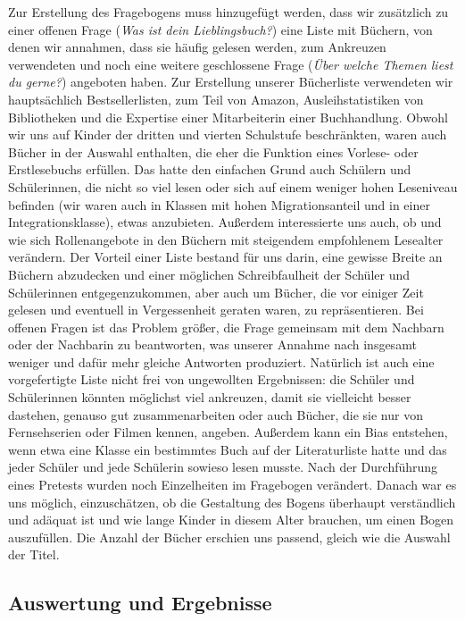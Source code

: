 Zur Erstellung des Fragebogens muss hinzugefügt werden, dass wir
zusätzlich zu einer offenen Frage (\emph{Was ist dein Lieblingsbuch?})
eine Liste mit Büchern, von denen wir annahmen, dass sie häufig gelesen
werden, zum Ankreuzen verwendeten und noch eine weitere geschlossene
Frage (\emph{Über welche Themen liest du gerne?}) angeboten haben. Zur
Erstellung unserer Bücherliste verwendeten wir hauptsächlich
Bestsellerlisten, zum Teil von Amazon, Ausleihstatistiken von
Bibliotheken und die Expertise einer Mitarbeiterin einer Buchhandlung.
Obwohl wir uns auf Kinder der dritten und vierten Schulstufe
beschränkten, waren auch Bücher in der Auswahl enthalten, die eher die
Funktion eines Vorlese- oder Erstlesebuchs erfüllen. Das hatte den
einfachen Grund auch Schülern und Schülerinnen, die nicht so viel lesen
oder sich auf einem weniger hohen Leseniveau befinden (wir waren auch in
Klassen mit hohen Migrationsanteil und in einer Integrationsklasse),
etwas anzubieten. Außerdem interessierte uns auch, ob und wie sich
Rollenangebote in den Büchern mit steigendem empfohlenem Lesealter
verändern. Der Vorteil einer Liste bestand für uns darin, eine gewisse
Breite an Büchern abzudecken und einer möglichen Schreibfaulheit der
Schüler und Schülerinnen entgegenzukommen, aber auch um Bücher, die vor
einiger Zeit gelesen und eventuell in Vergessenheit geraten waren, zu
repräsentieren. Bei offenen Fragen ist das Problem größer, die Frage
gemeinsam mit dem Nachbarn oder der Nachbarin zu beantworten, was
unserer Annahme nach insgesamt weniger und dafür mehr gleiche Antworten
produziert. Natürlich ist auch eine vorgefertigte Liste nicht frei von
ungewollten Ergebnissen: die Schüler und Schülerinnen könnten möglichst
viel ankreuzen, damit sie vielleicht besser dastehen, genauso gut
zusammenarbeiten oder auch Bücher, die sie nur von Fernsehserien oder
Filmen kennen, angeben. Außerdem kann ein Bias entstehen, wenn etwa eine
Klasse ein bestimmtes Buch auf der Literaturliste hatte und das jeder
Schüler und jede Schülerin sowieso lesen musste. Nach der Durchführung
eines Pretests wurden noch Einzelheiten im Fragebogen verändert. Danach
war es uns möglich, einzuschätzen, ob die Gestaltung des Bogens
überhaupt verständlich und adäquat ist und wie lange Kinder in diesem
Alter brauchen, um einen Bogen auszufüllen. Die Anzahl der Bücher
erschien uns passend, gleich wie die Auswahl der Titel.

\subsection{Auswertung und Ergebnisse}

